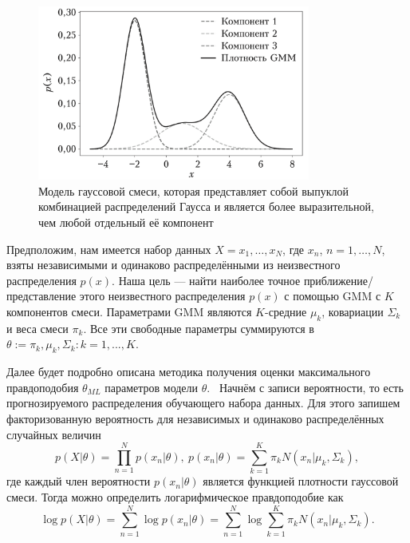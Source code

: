 \begin{figure}[H]
	\centering
	\includegraphics[width=0.8\textwidth]{assets/gmm.png}
	\caption{Модель	гауссовой смеси, которая представляет собой выпуклой комбинацией распределений Гаусса и является более выразительной, чем любой отдельный её компонент}
	\label{fig:gmm}
\end{figure}

Предположим, нам имеется набор данных $X = {x_1, \dots, x_N}$, где $x_n$, $n = 1, \dots, N$, взяты независимыми и одинаково распределёнными из неизвестного распределения $p(x)$. Наша цель --- найти наиболее точное приближение/представление этого неизвестного распределения $p(x)$ с помощью GMM с $K$ компонентов смеси. Параметрами GMM являются $K$-средние $\mu_k$, ковариации $\Sigma_k$ и веса смеси $\pi_k$. Все эти свободные параметры суммируются в $\theta := {\pi_k, \mu_k, \Sigma_k : k = 1, ..., K}$.~\cite{math}

Далее будет подробно описана методика получения оценки максимального правдоподобия $\theta_{ML}$ параметров модели $\theta$.~\cite{math} Начнём с записи вероятности, то есть прогнозируемого распределения обучающего набора данных. Для этого запишем факторизованную вероятность для независимых и одинаково распределённых случайных величин
\begin{equation}
	p(X \vert \theta) = \prod_{n=1}^{N}p(x_n \vert \theta),\ p(x_n \vert \theta) = \sum_{k=1}^{K}\pi_k N(x_n \vert \mu_k, \Sigma_k),
\end{equation}
где каждый член вероятности $p(x_n \vert \theta)$ является функцией плотности гауссовой смеси. Тогда можно определить логарифмическое правдоподобие как
\begin{equation}\label{eq:theta}
	\log p(X \vert \theta) = \sum_{n=1}^{N}\log p(x_n \vert \theta) = \sum_{n=1}^{N}\log \sum_{k=1}^{K}\pi_k N(x_n \vert \mu_k, \Sigma_k).
\end{equation}


